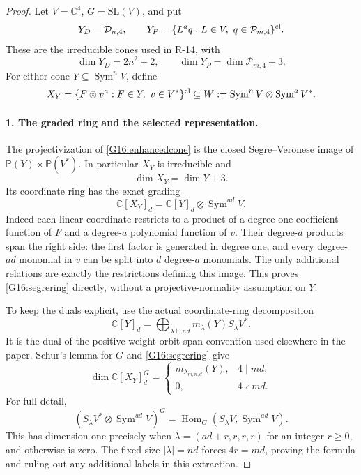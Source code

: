 \begin{proof}
Let $V=\mathbb C^4$, $G=\mathrm{SL}(V)$, and put
\[
 Y_D=\mathcal D_{n,4},\qquad
 Y_P=\{L^a q:L\in V,\ q\in\mathcal P_{m,4}\}^{\rm cl}.
\]
These are the irreducible cones used in R-14, with
\[
 \dim Y_D=2n^2+2,\qquad
 \dim Y_P=\dim\mathcal P_{m,4}+3.
\]
For either cone $Y\subseteq\operatorname{Sym}^n V$, define
\begin{equation}\label{G16:enhancedcone}
 X_Y=\{F\otimes v^a:F\in Y,\ v\in V^*\}^{\rm cl}
 \subseteq W:=\operatorname{Sym}^n V\otimes\operatorname{Sym}^a V^*.
\end{equation}

\paragraph{1. The graded ring and the selected representation.}
The projectivization of \eqref{G16:enhancedcone} is the closed
Segre--Veronese image of $\mathbb P(Y)\times\mathbb P(V^*)$.
In particular $X_Y$ is irreducible and
\begin{equation}\label{G16:xdimension}
 \dim X_Y=\dim Y+3.
\end{equation}
Its coordinate ring has the exact grading
\begin{equation}\label{G16:segrering}
 \mathbb C[X_Y]_d=
       \mathbb C[Y]_d\otimes\operatorname{Sym}^{ad}V.
\end{equation}
Indeed each linear coordinate restricts to a product of a degree-one
coefficient function of $F$ and a degree-$a$ polynomial function of $v$.
Their degree-$d$ products span the right side: the first factor is
generated in degree one, and every degree-$ad$ monomial in $v$ can
be split into $d$ degree-$a$ monomials. The only additional relations
are exactly the restrictions defining this image. This proves
\eqref{G16:segrering} directly, without a projective-normality assumption
on $Y$.

To keep the duals explicit, use the actual coordinate-ring decomposition
\[
 \mathbb C[Y]_d=
       \bigoplus_{\lambda\vdash nd}m_\lambda(Y)S_\lambda V^*.
\]
It is the dual of the positive-weight orbit-span convention used
elsewhere in the paper. Schur's lemma for $G$ and
\eqref{G16:segrering} give
\begin{equation}\label{G16:extraction}
 \dim\mathbb C[X_Y]_d^G=
 \begin{cases}
 m_{\lambda_{m,n,d}}(Y),&4\mid md,\\
 0,&4\nmid md.
 \end{cases}
\end{equation}
For full detail,
\[
 (S_\lambda V^*\otimes\operatorname{Sym}^{ad}V)^G
   =\operatorname{Hom}_G(S_\lambda V,\operatorname{Sym}^{ad}V).
\]
This has dimension one precisely when
$\lambda=(ad+r,r,r,r)$ for an integer $r\geq0$, and otherwise is
zero. The fixed size $|\lambda|=nd$ forces $4r=md$, proving
the formula and ruling out any additional labels in this extraction.


\end{proof}
